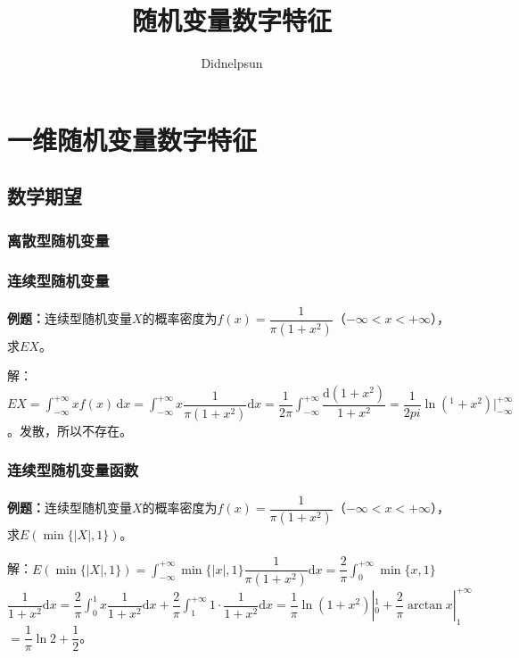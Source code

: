 \documentclass[UTF8, 12pt]{ctexart}
\author{Didnelpsun}
\title{随机变量数字特征}
\date{}
\begin{document}
\maketitle
\pagestyle{empty}
\thispagestyle{empty}
\tableofcontents
\thispagestyle{empty}
\newpage
\pagestyle{plain}
\setcounter{page}{1}
\section{一维随机变量数字特征}

\subsection{数学期望}

\subsubsection{离散型随机变量}

\subsubsection{连续型随机变量}

\textbf{例题：}连续型随机变量$X$的概率密度为$f(x)=\dfrac{1}{\pi(1+x^2)}$（$-\infty<x<+\infty$），求$EX$。

解：$EX=\int_{-\infty}^{+\infty}xf(x)\,\textrm{d}x=\int_{-\infty}^{+\infty}x\dfrac{1}{\pi(1+x^2)}\textrm{d}x=\dfrac{1}{2\pi}\int_{-\infty}^{+\infty}\dfrac{\textrm{d}(1+x^2)}{1+x^2}=\dfrac{1}{2pi}\ln(^1+x^2)|_{-\infty}^{+\infty}$。发散，所以不存在。

\subsubsection{连续型随机变量函数}

\textbf{例题：}连续型随机变量$X$的概率密度为$f(x)=\dfrac{1}{\pi(1+x^2)}$（$-\infty<x<+\infty$），求$E(\min\{\vert X\vert,1\})$。

解：$E(\min\{\vert X\vert,1\})=\displaystyle{\int_{-\infty}^{+\infty}}\min\{\vert x\vert,1\}\dfrac{1}{\pi(1+x^2)}\textrm{d}x=\dfrac{2}{\pi}\int_0^{+\infty}\min\{x,1\}$\\$\dfrac{1}{1+x^2}\textrm{d}x=\dfrac{2}{\pi}\displaystyle{\int_0^1}x\dfrac{1}{1+x^2}\textrm{d}x+\dfrac{2}{\pi}\int_1^{+\infty}1\cdot\dfrac{1}{1+x^2}\textrm{d}x=\dfrac{1}{\pi}\ln(1+x^2)|_0^1+\dfrac{2}{\pi}\arctan x|_1^{+\infty}$\\$=\dfrac{1}{\pi}\ln2+\dfrac{1}{2}$。
\end{document}
